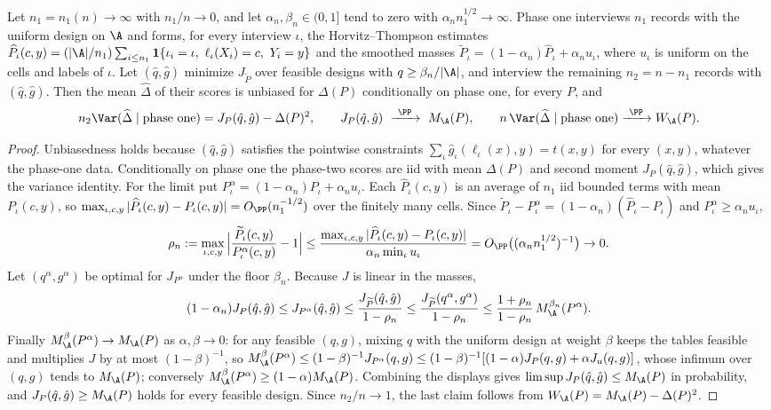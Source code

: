 \begin{proposition}\label{prop:selfcal}
Let $n_1=n_1(n)\to\infty$ with $n_1/n\to0$, and let $\alpha_n,\beta_n\in(0,1]$
tend to zero with $\alpha_n n_1^{1/2}\to\infty$. Phase one interviews $n_1$
records with the uniform design on $\A$ and forms, for every interview $\iota$,
the Horvitz--Thompson estimates
$\widehat P_\iota(c,y)=(|\A|/n_1)\sum_{i\le n_1}\mathbf 1\{\iota_i=\iota,\ \ell_\iota(X_i)=c,\ Y_i=y\}$
and the smoothed masses $\widetilde P_\iota=(1-\alpha_n)\widehat P_\iota+\alpha_n u_\iota$,
where $u_\iota$ is uniform on the cells and labels of $\iota$. Let
$(\hat q,\hat g)$ minimize $J_{\widetilde P}$ over feasible designs with
$q\ge\beta_n/|\A|$, and interview the remaining $n_2=n-n_1$ records with
$(\hat q,\hat g)$. Then the mean $\widehat\Delta$ of their scores is
unbiased for $\Delta(P)$ conditionally on phase one, for every $P$, and
\[
 n_2\Var(\widehat\Delta\mid\text{phase one})=J_P(\hat q,\hat g)-\Delta(P)^2,
 \qquad J_P(\hat q,\hat g)\ \xrightarrow{\ \PP\ }\ M_\A(P),
 \qquad n\,\Var(\widehat\Delta\mid\text{phase one})\xrightarrow{\ \PP\ }W_\A(P).
\]
\end{proposition}
\begin{proof}
Unbiasedness holds because $(\hat q,\hat g)$ satisfies the pointwise
constraints $\sum_\iota\hat g_\iota(\ell_\iota(x),y)=t(x,y)$ for every $(x,y)$,
whatever the phase-one data. Conditionally on phase one the phase-two scores
are iid with mean $\Delta(P)$ and second moment $J_P(\hat q,\hat g)$, which
gives the variance identity. For the limit put $P^{\alpha}_\iota=(1-\alpha_n)P_\iota+\alpha_nu_\iota$.
Each $\widehat P_\iota(c,y)$ is an average of $n_1$ iid bounded terms with
mean $P_\iota(c,y)$, so $\max_{\iota,c,y}|\widehat P_\iota(c,y)-P_\iota(c,y)|=O_\PP(n_1^{-1/2})$
over the finitely many cells. Since
$\widetilde P_\iota-P^\alpha_\iota=(1-\alpha_n)(\widehat P_\iota-P_\iota)$ and
$P^\alpha_\iota\ge\alpha_nu_\iota$,
\[
 \rho_n:=\max_{\iota,c,y}\Big|\frac{\widetilde P_\iota(c,y)}{P^\alpha_\iota(c,y)}-1\Big|
 \le\frac{\max_{\iota,c,y}|\widehat P_\iota(c,y)-P_\iota(c,y)|}{\alpha_n\min_\iota u_\iota}
 =O_\PP\big((\alpha_nn_1^{1/2})^{-1}\big)\to0 .
\]
Let $(q^\alpha,g^\alpha)$ be optimal for $J_{P^\alpha}$ under the floor
$\beta_n$. Because $J$ is linear in the masses,
\[
 (1-\alpha_n)J_P(\hat q,\hat g)\le J_{P^\alpha}(\hat q,\hat g)\le\frac{J_{\widetilde P}(\hat q,\hat g)}{1-\rho_n}
 \le\frac{J_{\widetilde P}(q^\alpha,g^\alpha)}{1-\rho_n}\le\frac{1+\rho_n}{1-\rho_n}\,M^{\beta_n}_\A(P^{\alpha}) .
\]
Finally $M^{\beta}_\A(P^{\alpha})\to M_\A(P)$ as $\alpha,\beta\to0$: for any
feasible $(q,g)$, mixing $q$ with the uniform design at weight $\beta$ keeps
the tables feasible and multiplies $J$ by at most $(1-\beta)^{-1}$, so
$M_\A^\beta(P^\alpha)\le(1-\beta)^{-1}J_{P^\alpha}(q,g)\le(1-\beta)^{-1}[(1-\alpha)J_P(q,g)+\alpha J_{u}(q,g)]$,
whose infimum over $(q,g)$ tends to $M_\A(P)$; conversely
$M_\A^\beta(P^\alpha)\ge(1-\alpha)M_\A(P)$. Combining the displays gives
$\limsup J_P(\hat q,\hat g)\le M_\A(P)$ in probability, and
$J_P(\hat q,\hat g)\ge M_\A(P)$ holds for every feasible design.
Since $n_2/n\to1$, the last claim follows from
$W_\A(P)=M_\A(P)-\Delta(P)^2$.
\end{proof}

